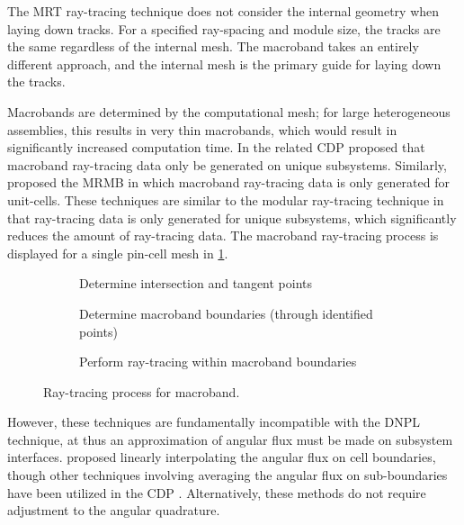 {{{      The \ac{MRT} ray-tracing technique does not consider the internal geometry when laying down tracks.
      For a specified ray-spacing and module size, the tracks are the same regardless of the internal mesh.
      The macroband takes an entirely different approach, and the internal mesh is the primary guide for laying down the tracks.

      Macrobands are determined by the computational mesh; for large heterogeneous assemblies, this results in very thin macrobands, which would result in significantly increased computation time.
      In the related \ac{CDP} \citet{Hong1999} proposed that macroband ray-tracing data only be generated on unique subsystems.
      Similarly, \citet{Yamamoto2005} proposed the \ac{MRMB} in which macroband ray-tracing data is only generated for unit-cells.
      These techniques are similar to the modular ray-tracing technique in that ray-tracing data is only generated for unique subsystems, which significantly reduces the amount of ray-tracing data.
      The macroband ray-tracing process is displayed for a single pin-cell mesh in \cref{fig:RT:Macroband Process}.

      \begin{figure}[!ht]
        \centering
        \begin{subfigure}[t]{0.33\linewidth}
          \centering
          \def\svgwidth{0.95\linewidth}
          
          \caption{Determine intersection and tangent points}
        \end{subfigure}%
        \hfill
        \begin{subfigure}[t]{0.33\linewidth}
          \centering
          \def\svgwidth{0.95\linewidth}
          
          \caption{Determine macroband boundaries (through identified points)}
        \end{subfigure}%
        \hfill
        \begin{subfigure}[t]{0.33\linewidth}
          \centering
          \def\svgwidth{0.95\linewidth}
          
          \caption{Perform ray-tracing within macroband boundaries}
        \end{subfigure}
        \caption{Ray-tracing process for macroband.}
        \label{fig:RT:Macroband Process}
      \end{figure}

      However, these techniques are fundamentally incompatible with the \ac{DNPL} technique, at thus an approximation of angular flux must be made on subsystem interfaces.
      \citet{Yamamoto2005} proposed linearly interpolating the angular flux on cell boundaries, though other techniques involving averaging the angular flux on sub-boundaries have been utilized in the \ac{CDP} \cite{Liu2014}.
      Alternatively, these methods do not require adjustment to the angular quadrature.

}}}
